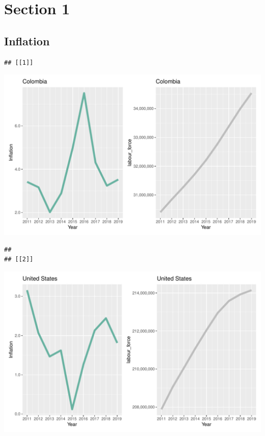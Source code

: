 \documentclass[11pt,a4paper,]{article}
\let\origfigure\figure
\let\endorigfigure\endfigure
\renewenvironment{figure}[1][2] {
    \expandafter\origfigure\expandafter[H]
} {
    \endorigfigure
}
\begin{document}
\section*{Section 1}

\hypertarget{inflation}{%
\subsection{Inflation}\label{inflation}}

\begin{verbatim}
## [[1]]
\end{verbatim}

\begin{figure}
\centering
\includegraphics{The_Outsiders_5513_files/figure-latex/A1-1.pdf}
\caption{\label{fig:A1-1}Inflation vs Labour force}
\end{figure}

\begin{verbatim}
## 
## [[2]]
\end{verbatim}

\begin{figure}
\centering
\includegraphics{The_Outsiders_5513_files/figure-latex/A1-2.pdf}
\caption{\label{fig:A1-2}Inflation vs Labour force}
\end{figure}
\end{document}
